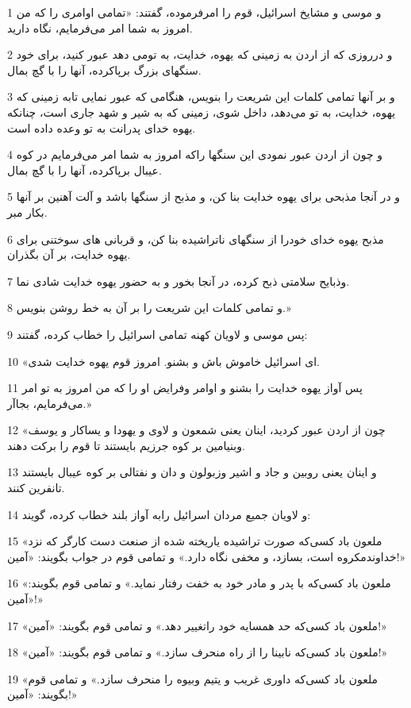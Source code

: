 \par 1 و موسی و مشایخ اسرائیل، قوم را امرفرموده، گفتند: «تمامی اوامری را که من امروز به شما امر می‌فرمایم، نگاه دارید.
\par 2 و درروزی که از اردن به زمینی که یهوه، خدایت، به تومی دهد عبور کنید، برای خود سنگهای بزرگ برپاکرده، آنها را با گچ بمال.
\par 3 و بر آنها تمامی کلمات این شریعت را بنویس، هنگامی که عبور نمایی تابه زمینی که یهوه، خدایت، به تو می‌دهد، داخل شوی، زمینی که به شیر و شهد جاری است، چنانکه یهوه خدای پدرانت به تو وعده داده است.
\par 4 و چون از اردن عبور نمودی این سنگها راکه امروز به شما امر می‌فرمایم در کوه عیبال برپاکرده، آنها را با گچ بمال.
\par 5 و در آنجا مذبحی برای یهوه خدایت بنا کن، و مذبح از سنگها باشد و آلت آهنین بر آنها بکار مبر.
\par 6 مذبح یهوه خدای خودرا از سنگهای ناتراشیده بنا کن، و قربانی های سوختنی برای یهوه خدایت، بر آن بگذران.
\par 7 وذبایح سلامتی ذبح کرده، در آنجا بخور و به حضور یهوه خدایت شادی نما.
\par 8 و تمامی کلمات این شریعت را بر آن به خط روشن بنویس.»
\par 9 پس موسی و لاویان کهنه تمامی اسرائیل را خطاب کرده، گفتند:
\par 10 «ای اسرائیل خاموش باش و بشنو. امروز قوم یهوه خدایت شدی.
\par 11 پس آواز یهوه خدایت را بشنو و اوامر وفرایض او را که من امروز به تو امر می‌فرمایم، بجاآر.» 
\par 12 «چون از اردن عبور کردید، اینان یعنی شمعون و لاوی و یهودا و یساکار و یوسف وبنیامین بر کوه جرزیم بایستند تا قوم را برکت دهند.
\par 13 و اینان یعنی روبین و جاد و اشیر وزبولون و دان و نفتالی بر کوه عیبال بایستند تانفرین کنند.
\par 14 و لاویان جمیع مردان اسرائیل رابه آواز بلند خطاب کرده، گویند:
\par 15 «ملعون باد کسی‌که صورت تراشیده یاریخته شده از صنعت دست کارگر که نزد خداوندمکروه است، بسازد، و مخفی نگاه دارد.» و تمامی قوم در جواب بگویند: «آمین!»
\par 16 «ملعون باد کسی‌که با پدر و مادر خود به خفت رفتار نماید.» و تمامی قوم بگویند: «آمین!»
\par 17 «ملعون باد کسی‌که حد همسایه خود راتغییر دهد.» و تمامی قوم بگویند: «آمین!»
\par 18 «ملعون باد کسی‌که نابینا را از راه منحرف سازد.» و تمامی قوم بگویند: «آمین!»
\par 19 «ملعون باد کسی‌که داوری غریب و یتیم وبیوه را منحرف سازد.» و تمامی قوم بگویند: «آمین!»
